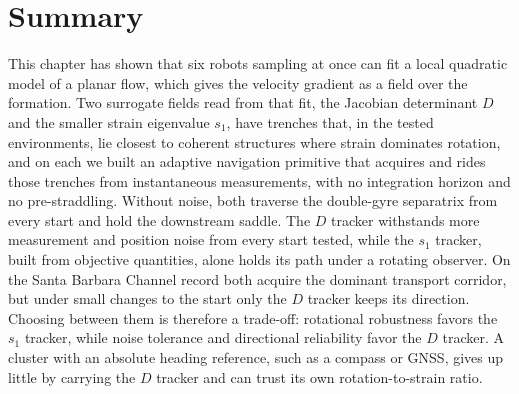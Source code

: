 \section{Summary}
\label{sec:ch7:summary}

This chapter has shown that six robots sampling at once can fit a local
quadratic model of a planar flow, which gives the velocity gradient as a
field over the formation. Two surrogate fields read from that fit, the
Jacobian determinant $D$ and the smaller strain eigenvalue $s_1$, have
trenches that, in the tested environments, lie closest to coherent
structures where strain dominates rotation, and on each we built an adaptive navigation primitive that acquires
and rides those trenches from instantaneous measurements, with no
integration horizon and no pre-straddling. Without noise, both traverse
the double-gyre separatrix from every start and hold the downstream
saddle. The $D$ tracker withstands more measurement and position noise
from every start tested, while the $s_1$ tracker, built from objective
quantities, alone holds its path under a rotating observer. On the Santa
Barbara Channel record both acquire the dominant transport corridor, but
under small changes to the start only the $D$ tracker keeps its
direction. Choosing between them is therefore a trade-off: rotational
robustness favors the $s_1$ tracker, while noise tolerance and directional
reliability favor the $D$ tracker. A cluster with an absolute heading
reference, such as a compass or GNSS, gives up little by carrying the $D$
tracker and can trust its own rotation-to-strain ratio.
